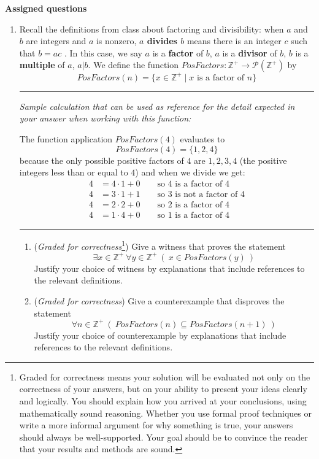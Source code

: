 \newpage
{\bf Assigned questions}

\begin{enumerate}
   \item Recall the definitions from class about factoring and divisibility:
   when $a$ and $b$ are integers and $a$ is nonzero, 
   {\bf $a$ divides $b$} means there is an integer $c$ such that $b = ac$ . 
   In this case, we say $a$ is a {\bf factor} of $b$, $a$ is a {\bf divisor} of $b$, 
   $b$ is a {\bf multiple} of $a$, 
   $a | b$.  We define the function 
   $PosFactors: \mathbb{Z}^+ \to \mathcal{P}(\mathbb{Z}^+)$ by 
   \[
        PosFactors (n) = \{ x \in \mathbb{Z}^+ \mid x\text{ is a factor of } n\}
   \]

   \rule{0.5\textwidth}{.4pt}

   {\it Sample calculation that can be used as reference for the detail expected 
   in your answer when working with this function:} 
   
   The function application $PosFactors(4)$ evaluates to 
   \[
       PosFactors (4) = \{ 1,2,4\}
   \]
   because the only possible positive factors of $4$ are $1,2,3,4$ (the positive integers less than 
   or equal to $4$) and when we divide we get:
   \begin{align*}
        4 &= 4 \cdot 1 + 0 \qquad \text{so $4$ is a factor of $4$}\\
        4 &= 3 \cdot 1 + 1 \qquad \text{so $3$ is not a factor of $4$}\\
        4 &= 2 \cdot 2 + 0 \qquad \text{so $2$ is a factor of $4$}\\
        4 &= 1 \cdot 4 + 0 \qquad \text{so $1$ is a factor of $4$}
   \end{align*}

   \rule{0.5\textwidth}{.4pt}

   \begin{enumerate}
     \item ({\it Graded for correctness}\footnote{Graded for correctness means your solution will be
     evaluated not only on the correctness of your answers, but on your ability to 
     present your ideas clearly and logically. You should explain how you arrived at your conclusions, using 
     mathematically sound reasoning. Whether you use formal proof techniques or write a more informal argument for why 
     something is true, your answers should always be well-supported. Your goal should be to convince the reader that 
     your results and methods are sound.}) Give a witness that proves the statement 
     \[
         \exists x \in \mathbb{Z}^+ ~\forall y \in \mathbb{Z}^+ ~\left(~x \in PosFactors(y)~\right)
     \]
     Justify your choice of witness by explanations that include references to the relevant definitions.
     \item ({\it Graded for correctness}) Give a counterexample that disproves the statement 
     \[
         \forall n \in \mathbb{Z}^+ ~\left(~ PosFactors(n) \subseteq PosFactors(n+1)~\right)
     \]
     Justify your choice of counterexample by explanations that include references to the relevant definitions.
    

\end{enumerate}
\end{enumerate}
